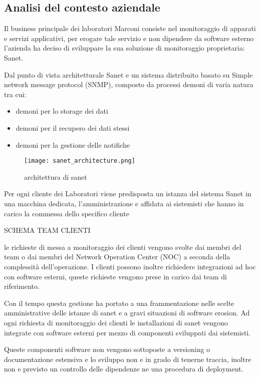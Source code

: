 \documentclass[12pt,a4paper,twoside,openright]{book}
\begin{document}
\subsection{Analisi del contesto aziendale}

Il business principale dei laboratori Marconi consiste nel monitoraggio di apparati e servizi applicativi, per erogare tale servizio e non dipendere da software esterno l'azienda ha deciso di sviluppare la sua soluzione di monitoraggio proprietaria: Sanet.

Dal punto di vista architetturale Sanet e un sistema distribuito basato su Simple network message protocol (SNMP), composto da processi demoni di varia natura tra cui:

\begin{itemize}
    \item demoni per lo storage dei dati
    \item demoni per il recupero dei dati stessi
    \item demoni per la gestione delle notifiche
\end{itemize}

\begin{figure}
    \centering
    \texttt{[image: sanet\_architecture.png]}
    \caption{architettura di sanet}
    \label{fig:enter-label}
\end{figure}
Per ogni cliente dei Laboratori viene predisposta un istanza del sistema Sanet in una macchina dedicata, l'amministrazione e affidata ai sistemisti che hanno in carico la commessa dello specifico cliente

SCHEMA TEAM CLIENTI

le richieste di messa a monitoraggio dei clienti vengono svolte dai membri del team o dai membri del Network Operation Center (NOC) a seconda della complessità dell'operazione. I clienti possono inoltre richiedere integrazioni ad hoc con software esterni, queste richieste vengono prese in carico dai team di riferimento.

Con il tempo questa gestione ha portato a una frammentazione nelle scelte amministrative delle istanze di sanet e a gravi situazioni di software erosion. Ad ogni richiesta di monitoraggio dei clienti le installazioni di sanet vengono integrate con software esterni per mezzo di componenti sviluppati dai sistemisti.

Queste componenti software non vengono sottoposte a versioning o documentazione estensiva e lo sviluppo non e in grado di tenerne traccia, inoltre non e previsto un controllo delle dipendenze ne una procedura di deployment.
\end{document}
